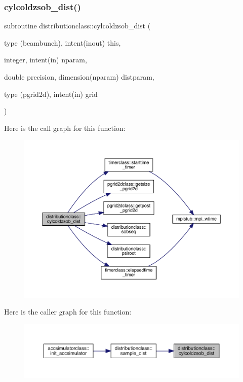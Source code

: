\subsubsection{\texorpdfstring{cylcoldzsob\_dist()}{cylcoldzsob\_dist()}}
{\footnotesize\ttfamily subroutine distributionclass\+::cylcoldzsob\+\_\+dist (\begin{DoxyParamCaption}\item[{type (beambunch), intent(inout)}]{this,  }\item[{integer, intent(in)}]{nparam,  }\item[{double precision, dimension(nparam)}]{distparam,  }\item[{type (pgrid2d), intent(in)}]{grid }\end{DoxyParamCaption})}

Here is the call graph for this function\+:\nopagebreak
\begin{figure}[H]
\begin{center}
\leavevmode
\includegraphics[width=350pt]{namespacedistributionclass_a149c64b379e691ba9bfba3dc16c44571_cgraph}
\end{center}
\end{figure}
Here is the caller graph for this function\+:\nopagebreak
\begin{figure}[H]
\begin{center}
\leavevmode
\includegraphics[width=350pt]{namespacedistributionclass_a149c64b379e691ba9bfba3dc16c44571_icgraph}
\end{center}
\end{figure}
\mbox{\label{namespacedistributionclass_af85f956a3fdb677022a546bc69ecfb3c}} 
